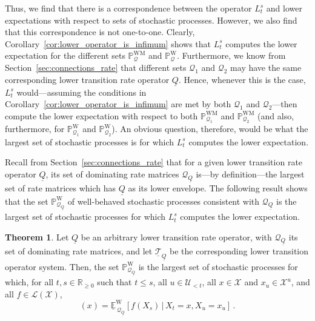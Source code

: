 \documentclass[10pt,a4paper]{paper}
\theoremstyle{definition}
\newtheorem{theorem}{Theorem}
\newcommand{\reals}{\mathbb{R}}
\newcommand{\realsnonneg}{\reals_{\geq 0}}
\newcommand{\states}{\mathcal{X}}
\newcommand{\processes}{\mathbb{P}}
\newcommand{\mprocesses}{\processes^{\mathrm{M}}}
\newcommand{\wprocesses}{\processes^{\mathrm{W}}}
\newcommand{\wmprocesses}{\processes^{\mathrm{WM}}}
\newcommand{\gambles}{\mathcal{L}}
\newcommand{\gamblesX}{\gambles(\states)}
\newcommand{\rateset}{\mathcal{Q}}
\newcommand{\lrate}{\underline{Q}}
\begin{document}
Thus, we find that there is a correspondence between the operator $L_t^s$ and lower expectations with respect to sets of stochastic processes. However, we also find that this correspondence is not one-to-one. Clearly, Corollary~\ref{cor:lower_operator_is_infimum} shows that $L_t^s$ computes the lower expectation for the different sets $\wmprocesses_\rateset$ and $\wprocesses_\rateset$. Furthermore, we know from Section~\ref{sec:connections_rate} that different sets $\rateset_1$ and $\rateset_2$ may have the same corresponding lower transition rate operator $\lrate$. Hence, whenever this is the case, $L_t^s$ would---assuming the conditions in Corollary~\ref{cor:lower_operator_is_infimum} are met by both $\rateset_1$ and $\rateset_2$---then compute the lower expectation with respect to both $\wmprocesses_{\rateset_1}$ and $\wmprocesses_{\rateset_2}$ (and also, furthermore, for $\wprocesses_{\rateset_1}$ and $\wprocesses_{\rateset_2}$). An obvious question, therefore, would be what the largest set of stochastic processes is for which $L_t^s$ computes the lower expectation.

%
%

Recall from Section~\ref{sec:connections_rate} that for a given lower transition rate operator $\lrate$, its set of dominating rate matrices $\rateset_{\lrate}$ is---by definition---the largest set of rate matrices which has $\lrate$ as its lower envelope. The following result shows that the set $\wprocesses_{\rateset_{\lrate}}$ of well-behaved stochastic processes consistent with $\rateset_{\lrate}$ is the largest set of stochastic processes for which $L_t^s$ computes the lower expectation.

\begin{theorem}\label{theo:dominating_rate_processes_max_set}
Let $\lrate$ be an arbitrary lower transition rate operator, with $\rateset_{\lrate}$ its set of dominating rate matrices, and let  $\underline{\mathcal{T}}_{\lrate}$ be the corresponding lower transition operator system. Then, the set $\wprocesses_{\rateset_{\lrate}}$ is the largest set of stochastic processes for which, for all $t,s\in\realsnonneg$ such that $t\leq s$, all $u\in\mathcal{U}_{<t}$, all $x\in\states$ and $x_u\in\states^u$, and all $f\in\gamblesX$,
\begin{equation*}
[L_t^sf](x) = \underline{\mathbb{E}}_{\,\rateset_{\lrate}}^{\mathrm{W}}[f(X_s)\,\vert\,X_t=x,X_u=x_u]\,.
\end{equation*}
\end{theorem}
\end{document}
